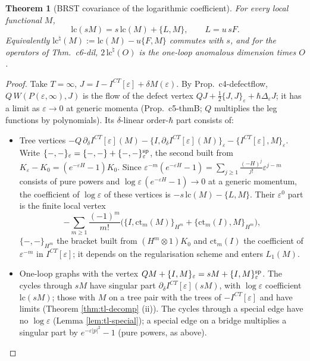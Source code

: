 \documentclass[11pt]{article}
\numberwithin{equation}{section}
\theoremstyle{plain}
\newtheorem{theorem}{Theorem}[section]
\theoremstyle{definition}
\begin{document}
\begin{theorem}[BRST covariance of the logarithmic coefficient]
\label{thm:tl-brst}
For every local functional $M$,
\begin{equation}
\mathrm{lc}(sM)=s\,\mathrm{lc}(M)+\{L,M\},\qquad L=u\,sF .
\label{eq:tl-brst}
\end{equation}
Equivalently $\mathrm{lc}^\natural(M):=\mathrm{lc}(M)-u\{F,M\}$ commutes with $s$, and for the operators of Thm.~c6-dil, $2\,\mathrm{lc}^\natural(O)$ is the one-loop anomalous dimension times $O$.
\end{theorem}

\begin{proof}
Take $T=\infty$, $J=I-I^{CT}[\varepsilon]+\delta M(\varepsilon)$. By Prop.~c4-defectflow, $Q\,W(P(\varepsilon,\infty),J)$ is the flow of the defect vertex $QJ+\tfrac12\{J,J\}_\varepsilon+\hbar\Delta_\varepsilon J$; it has a limit as $\varepsilon\to0$ at generic momenta (Prop.~c5-thmB; $Q$ multiplies the leg functions by polynomials). Its $\delta$-linear order-$\hbar$ part consists of:
\begin{itemize}
\item Tree vertices $-Q\,\partial_\delta I^{CT}[\varepsilon](M)-\{I,\partial_\delta I^{CT}[\varepsilon](M)\}_\varepsilon-\{I^{CT}[\varepsilon],M\}_\varepsilon$. Write $\{-,-\}_\varepsilon=\{-,-\}+\{-,-\}_{\varepsilon}^{\rm sp}$, the second built from $K_\varepsilon-K_0=(e^{-\varepsilon H}-1)K_0$. Since $\varepsilon^{-m}(e^{-\varepsilon H}-1)=\sum_{j\ge1}\frac{(-H)^j}{j!}\varepsilon^{j-m}$ consists of pure powers and $\log\varepsilon\,(e^{-\varepsilon H}-1)\to0$ at a generic momentum, the coefficient of $\log\varepsilon$ of these vertices is $-s\,\mathrm{lc}(M)-\{L,M\}$. Their $\varepsilon^0$ part is the finite local vertex
\begin{equation}
-\sum_{m\ge1}\frac{(-1)^m}{m!}\Big(\{I,\mathrm{ct}_m(M)\}_{H^m}+\{\mathrm{ct}_m(I),M\}_{H^m}\Big),
\label{eq:tl-finitesp}
\end{equation}
$\{-,-\}_{H^m}$ the bracket built from $(H^m\otimes1)K_0$ and $\mathrm{ct}_m(I)$ the coefficient of $\varepsilon^{-m}$ in $I^{CT}[\varepsilon]$; it depends on the regularisation scheme and enters $L_1(M)$.
\item One-loop graphs with the vertex $QM+\{I,M\}_\varepsilon=sM+\{I,M\}^{\rm sp}_\varepsilon$. The cycles through $sM$ have singular part $\partial_\delta I^{CT}[\varepsilon](sM)$, with $\log\varepsilon$ coefficient $\mathrm{lc}(sM)$; those with $M$ on a tree pair with the trees of $-I^{CT}[\varepsilon]$ and have limits (Theorem \ref{thm:tl-decomp} (ii)). The cycles through a special edge have no $\log\varepsilon$ (Lemma \ref{lem:tl-special}); a special edge on a bridge multiplies a singular part by $e^{-\varepsilon|p|^2}-1$ (pure powers, as above).

\end{itemize}
\end{proof}
\end{document}
